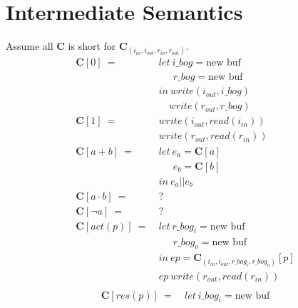 \documentclass[12pt, letterpaper]{article}
\begin{document}
\section{Intermediate Semantics}
Assume all $\mathbf{C}$ is short for $\mathbf{C}_{(i_{in},i_{out},r_{in},r_{out})}$.
 {\fontsize{12pt}{14pt}\selectfont
     \begin{align*}
         \mathbf{C}[0]\ 
             =\ &
             let\ i\_bog = \text{new buf}\\
             &\quad\ \ r\_bog = \text{new buf}\\
             &in\ write(i_{out}, i\_bog)\\
             &\quad  write(r_{out}, r\_bog)\\
         \mathbf{C}[1]\ 
             =\ &
             write(i_{out}, read(i_{in}))\\
             &write(r_{out}, read(r_{in}))
             \\ %
         \mathbf{C}[a + b]\ 
             =\ &
             let\ e_a = \mathbf{C}[a]\\
             &\quad\ \ e_b = \mathbf{C}[b]\\
             &in\ e_a || e_b\\
         \mathbf{C}[a \cdot b]\ 
             =\ &
             ?
             \\
         \mathbf{C}[\neg a]\ 
             =\ &
             ?
             \\
         \mathbf{C}[act(p)]\ 
             =\ &
             let\ r\_bog_i = \text{new buf}\\
             &\quad\ \ r\_bog_o = \text{new buf}\\
             &in\ ep = \mathbf{C}_{(i_{in}, i_{out}, r\_bog_i, r\_bog_o)}[p]\\
             &ep\ write(r_{out}, read(r_{in}))
             \\
    \end{align*}
    \begin{align*}
         \mathbf{C}[res(p)]\ 
             =\ &
             let\ i\_bog_i = \text{new buf}\\

\end{align*}}
\end{document}
